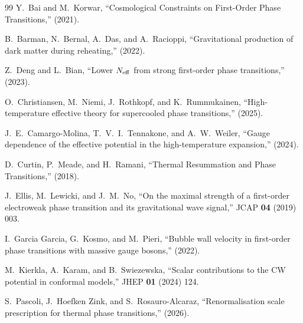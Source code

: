 \documentclass[12pt,a4paper]{article}
\begin{document}
\begin{thebibliography}{99}
Y.~Bai and M.~Korwar,
``Cosmological Constraints on First-Order Phase Transitions,''
(2021).

B.~Barman, N.~Bernal, A.~Das, and A.~Racioppi,
``Gravitational production of dark matter during reheating,''
(2022).

Z.~Deng and L.~Bian,
``Lower $N_{\rm eff}$ from strong first-order phase transitions,''
(2023).

O.~Christiansen, M.~Niemi, J.~Rothkopf, and K.~Rummukainen,
``High-temperature effective theory for supercooled phase transitions,''
(2025).

J.~E.~Camargo-Molina, T.~V.~I.~Tennakone, and A.~W.~Weiler,
``Gauge dependence of the effective potential in the high-temperature expansion,''
(2024).

D.~Curtin, P.~Meade, and H.~Ramani,
``Thermal Resummation and Phase Transitions,''
(2018).

J.~Ellis, M.~Lewicki, and J.~M.~No,
``On the maximal strength of a first-order electroweak phase transition and its gravitational wave signal,''
JCAP \textbf{04} (2019) 003.

I.~Garcia Garcia, G.~Kosmo, and M.~Pieri,
``Bubble wall velocity in first-order phase transitions with massive gauge bosons,''
(2022).

M.~Kierkla, A.~Karam, and B.~Swiezewska,
``Scalar contributions to the CW potential in conformal models,''
JHEP \textbf{01} (2024) 124.

S.~Pascoli, J.~Hoefken Zink, and S.~Rosauro-Alcaraz,
``Renormalisation scale prescription for thermal phase transitions,''
(2026).

\end{thebibliography}
\end{document}
